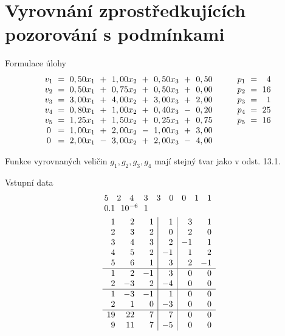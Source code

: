%
% 
% 
% 
% 
%

\section*{Vyrovnání zprostředkujících pozorování s podmínkami}


\begin{Example}{Formulace úlohy}
\begin{align*}
\arraycolsep=3pt
\begin{array}{crrrrrrrrrrrr}
   v_1 &=& 0,50x_1 &+& 1,00x_2 &+& 0,50x_3 &+& 0,50 \Sep  p_1 &=&  4 \\
   v_2 &=& 0,50x_1 &+& 0,75x_2 &+& 0,50x_3 &+& 0,00 \Sep  p_2 &=& 16 \\
   v_3 &=& 3,00x_1 &+& 4,00x_2 &+& 3,00x_3 &+& 2,00 \Sep  p_3 &=&  1 \\
   v_4 &=& 0,80x_1 &+& 1,00x_2 &+& 0,40x_3 &-& 0,20 \Sep  p_4 &=& 25 \\
   v_5 &=& 1,25x_1 &+& 1,50x_2 &+& 0,25x_3 &+& 0,75 \Sep  p_5 &=& 16 \\
   0   &=& 1,00x_1 &+& 2,00x_2 &-& 1,00x_3 &+& 3,00 \\
   0   &=& 2,00x_1 &-& 3,00x_2 &+& 2,00x_3 &-& 4,00 \\
\end{array}
\end{align*}
\end{Example}
%

\noindent Funkce vyrovnaných veličin $g_1, g_2, g_3, g_4$ mají stejný
tvar jako v odst. 13.1.

\begin{Example}{Vstupní data}
\begin{align*}
\begin{array}{rrrrrrrrr}
 5 &  2 & 4 & 3 & 3 & 0 & 0 & 1 & 1 \\
\multicolumn{4}{l}{0.1 ~~ 10^{-6} ~~ 1} \\
\end{array}
\\
\begin{array}{rrr|r|rr}
1 & 2 & 1 &  1 & 3 & 1 \\
2 & 3 & 2 &  0 & 2 & 0 \\
3 & 4 & 3 &  2 &-1 & 1 \\
4 & 5 & 2 & -1 & 1 & 2 \\
5 & 6 & 1 &  3 & 2 &-1 \\
\hline
1 & 2 &-1 &  3 & 0 & 0 \\
2 &-3 & 2 & -4 & 0 & 0 \\
\hline
1 &-3 &-1 &  1 & 0 & 0 \\
2 & 1 & 0 & -3 & 0 & 0 \\
\hline
19& 22& 7 &  7 & 0 & 0 \\
 9& 11& 7 & -5 & 0 & 0 \\
\end{array}
\end{align*}
\end{Example}


